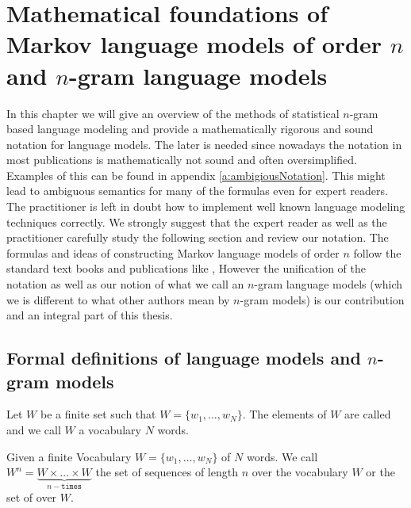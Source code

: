\documentclass[•]{book}
\begin{document}

\chapter{Mathematical foundations of Markov language models of order $n$ and $n$-gram language models}
In this chapter we will give an overview of the methods of statistical $n$-gram based language modeling and provide a mathematically rigorous and sound notation for language models. 
The later is needed since nowadays the notation in most publications is mathematically not sound and often oversimplified. Examples of this can be found in appendix \ref{a:ambigiousNotation}.
This might lead to ambiguous semantics for many of the formulas even for expert readers. 
The practitioner is left in doubt how to implement well known language modeling techniques correctly. 
We strongly suggest that the expert reader as well as the practitioner carefully study the following section and review our notation. 
The formulas and ideas of constructing Markov language models of order $n$ follow the standard text books and publications like \cite{chen:goodman},  
However the unification of the notation as well as our notion of what we call an $n$-gram language models (which we is different to what other authors mean by $n$-gram models) is our contribution and an integral part of this thesis. 

\section{Formal definitions of language models and $n$-gram models}\label{sec:basicDefinitions}
\begin{definition}
Let $W$ be a finite set such that $W = \{w_1,\dots,w_N\}$. The elements of $W$ are called  and we call $W$ a \gls{vocabulary} $N$ words.
\end{definition}

\begin{definition}
Given a finite Vocabulary $W = \{w_1,\dots,w_N\}$ of $N$ words. 
We call $W^{n}=\underbrace{W\times \dots\times W}_{n-\texttt{times}}$ the set of sequences of length $n$ over the vocabulary $W$ or the set of  over $W$. 
\end{definition}
\end{document}
